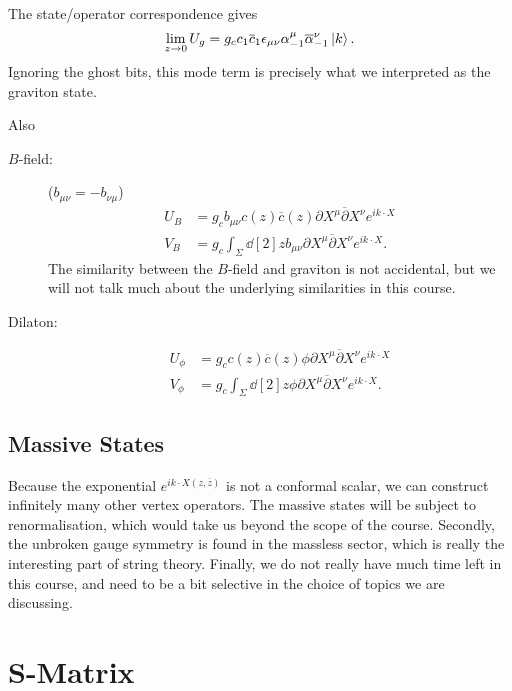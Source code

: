 The state/operator correspondence gives
\begin{equation}
  \lim_{z \to 0} U_{g} = g_c c_1 \overline{c}{}_1 \epsilon_{\mu\nu} \alpha^{\mu}_{-1} \overline{\alpha}{}^{\nu}_{-1} \ket{k}.
\end{equation}
Ignoring the ghost bits, this mode term is precisely what we interpreted as the graviton state.

Also 
\begin{description}
  \item[$B$-field:] ($b_{\mu\nu} = - b_{\nu\mu}$)
    \begin{align}
      U_B &= g_c b_{\mu\nu} c(z) \overline{c}{}(z) \partial X^{\mu} \overline{\partial}{} X^{\nu} e^{i k \cdot X} \\
      V_B &= g_c \int_{\Sigma} \dd[2]{z} b_{\mu\nu} \partial X^{\mu} \overline{\partial}{} X^{\nu} e^{i k \cdot X}.
    \end{align}
    The similarity between the $B$-field and graviton is not accidental, but we will not talk much about the underlying similarities in this course.
  \item[Dilaton:]
    \begin{align}
      U_\phi &= g_c c(z) \overline{c}{}(z) \phi \partial X^{\mu} \overline{\partial}{} X^{\nu} e^{i k \cdot X} \\
      V_\phi &= g_c \int_{\Sigma} \dd[2]{z} \phi \partial X^{\mu} \overline{\partial}{} X^{\nu} e^{i k \cdot X}.
    \end{align}
\end{description}

\subsection*{Massive States}%

Because the exponential $e^{i k \cdot X(z, \overline{z}{})}$ is not a conformal scalar, we can construct infinitely many other vertex operators.
The massive states will be subject to renormalisation, which would take us beyond the scope of the course.
Secondly, the unbroken gauge symmetry is found in the massless sector, which is really the interesting part of string theory.
Finally, we do not really have much time left in this course, and need to be a bit selective in the choice of topics we are discussing.

\section{S-Matrix}%
\label{sec:s_matrix}

